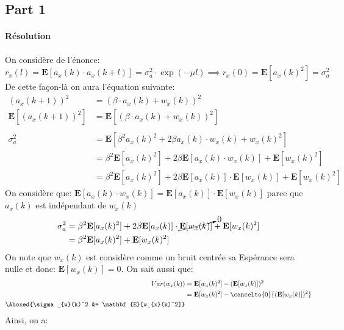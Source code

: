 \documentclass{article}
\begin{document}
\subsection{Part 1}
\paragraph{Résolution}On considère de l'énonce:
\begin{equation}
    r_{x}(l) = \mathbf{E}[a_{x}(k) \cdot a_{x}(k+l)] = \sigma_{a}^{2} \cdot \exp{(-\mu l)} \implies
    r_{x}(0) = \boxed{\mathbf{E}[a_{x}(k)^{2}] = \sigma_{a}^{2}}
\end{equation}
\noindent De cette façon-là on aura l'équation suivante:
\begin{align*}
    (a_{x}(k+1))^2 &= (\beta \cdot a_{x}(k) + w_{x}(k))^2\\
    \mathbf{E}[(a_{x}(k+1))^2] &= \mathbf{E}[(\beta \cdot a_{x}(k) + w_{x}(k))^2]\\\\
    \sigma_{a}^{2} &= \mathbf{E}[\beta^2 a_{x}(k)^{2} + 2 \beta a_{x}(k) \cdot w_{x}(k) + w_{x}(k)^2]\\
    &= \beta^2 \mathbf{E}[a_{x}(k)^{2}] + 2 \beta \mathbf{E}[a_{x}(k) \cdot w_{x}(k)] + \mathbf{E}[w_{x}(k)^2]\\
    &= \beta^2 \mathbf{E}[a_{x}(k)^{2}] + 2 \beta \mathbf{E}[a_{x}(k)] \cdot \mathbf{E}[w_{x}(k)] + \mathbf{E}[w_{x}(k)^2]
\end{align*}
\noindent On considère que: $\mathbf{E}[a_{x}(k) \cdot w_{x}(k)] = \mathbf{E}[a_{x}(k)] \cdot \mathbf{E}[w_{x}(k)]$ parce que $a_{x}(k)$ est indépendant de $w_{x}(k)$
\begin{align*}
    \sigma_{a}^{2} &= \beta^2 \mathbf{E}[a_{x}(k)^{2}] + 2 \beta \mathbf{E}[a_{x}(k)] \cdot \cancelto{0}{\mathbf{E}[w_{x}(k)]} + \mathbf{E}[w_{x}(k)^2]\\
     &= \beta^2 \mathbf{E}[a_{x}(k)^{2}] + \mathbf{E}[w_{x}(k)^2]
\end{align*}
\noindent On note que $w_{x}(k)$ est considère comme un bruit centrée sa Espérance sera nulle et donc: $\mathbf{E}[w_{x}(k)] = 0$. On sait aussi que:
\begin{align*}
     Var(w_{x}(k)) &= \mathbf{E}[w_{x}(k)^2] - (\mathbf{E}[w_{x}(k)])^2\\
     &= \mathbf{E}[w_{x}(k)^2] - \cancelto{0}{(\mathbf{E}[w_{x}(k)])^2}\\
     \Aboxed{\sigma_{w}(k)^2 &= \mathbf{E}[w_{x}(k)^2]}
\end{align*}
\noindent Ainsi, on a:
\end{document}
